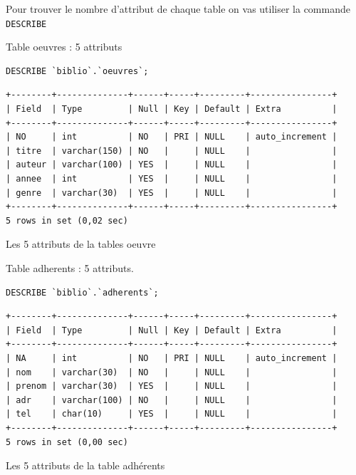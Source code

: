 \documentclass{article}
\begin{document}
Pour trouver le nombre d'attribut de chaque table on vas utiliser la commande \texttt{DESCRIBE}
\begin{center}
\begin{minipage}{0.8\linewidth}
Table oeuvres : 5 attributs
\begin{listing}[H]
\begin{verbatim}
DESCRIBE `biblio`.`oeuvres`;
\end{verbatim}
\begin{verbatim}
+--------+--------------+------+-----+---------+----------------+
| Field  | Type         | Null | Key | Default | Extra          |
+--------+--------------+------+-----+---------+----------------+
| NO     | int          | NO   | PRI | NULL    | auto_increment |
| titre  | varchar(150) | NO   |     | NULL    |                |
| auteur | varchar(100) | YES  |     | NULL    |                |
| annee  | int          | YES  |     | NULL    |                |
| genre  | varchar(30)  | YES  |     | NULL    |                |
+--------+--------------+------+-----+---------+----------------+
5 rows in set (0,02 sec)
\end{verbatim}
\caption{Les 5 attributs de la tables oeuvre}
\end{listing}
\end{minipage}


\begin{minipage}{0.8\linewidth}
Table adherents : 5 attributs.
\begin{listing}[H]
\begin{verbatim}
DESCRIBE `biblio`.`adherents`;
\end{verbatim}
\begin{verbatim}
+--------+--------------+------+-----+---------+----------------+
| Field  | Type         | Null | Key | Default | Extra          |
+--------+--------------+------+-----+---------+----------------+
| NA     | int          | NO   | PRI | NULL    | auto_increment |
| nom    | varchar(30)  | NO   |     | NULL    |                |
| prenom | varchar(30)  | YES  |     | NULL    |                |
| adr    | varchar(100) | NO   |     | NULL    |                |
| tel    | char(10)     | YES  |     | NULL    |                |
+--------+--------------+------+-----+---------+----------------+
5 rows in set (0,00 sec)
\end{verbatim}
\caption{Les 5 attributs de la table adhérents}
\end{listing}
\end{minipage}	


\end{center}
\end{document}
